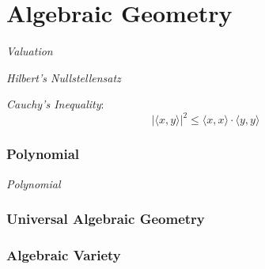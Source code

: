 \part{Algebraic Geometry}\label{sec:algebraic_geometry}

\emph{Valuation}

\emph{Hilbert's Nullstellensatz}

\emph{Cauchy's Inequality}:
\[
    |\langle x,y \rangle|^2 \leq \langle x,x \rangle \cdot \langle
    y,y \rangle
\]



\section{Polynomial}\label{sec:polynomial}

\emph{Polynomial}



\section{Universal Algebraic Geometry}



\section{Algebraic Variety}\label{sec:algebraic_variety}
